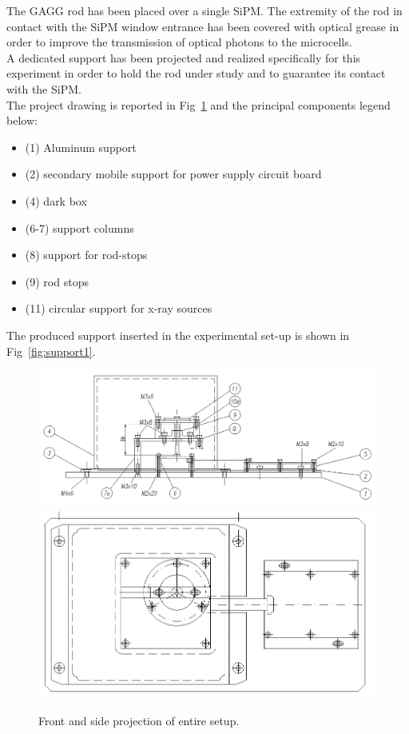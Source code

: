 \documentclass[10pt,a4paper, openany]{book}
\begin{document}
The GAGG rod has been placed over a single SiPM. The extremity of the rod in contact with the SiPM window entrance has been covered with optical grease in order to improve the transmission of optical photons to the microcells.\\
A dedicated support has been projected and realized specifically for this experiment in order to hold the rod under study and to guarantee its contact with the SiPM.\\
The project drawing is reported in Fig~\ref{fig:cad} and the principal components legend below:
\begin{itemize}
\item (1) Aluminum support
\item (2) secondary mobile support for power supply circuit board
\item (4) dark box
\item (6-7) support columns 
\item (8) support for rod-stops
\item (9) rod stops
\item (11) circular support for x-ray sources
\end{itemize}
The produced support inserted in the experimental set-up is shown in Fig~\ref{fig:support1}.

\newpage
\begin{figure}[!h]
\begin{center}
\includegraphics[scale=0.45]{imm/cad1.png}\\
\includegraphics[scale=0.45]{imm/cad2.png}\\
\end{center}
\caption{Front and side projection of entire setup.}
\label{fig:cad}
\end{figure}
\end{document}
